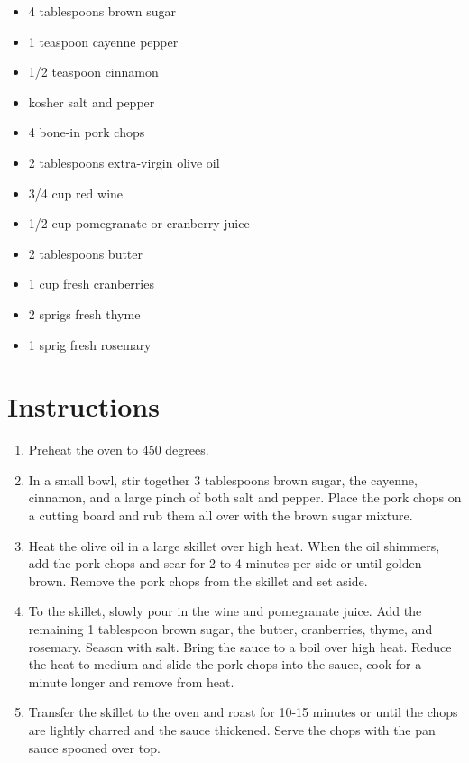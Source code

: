 \documentclass[
  letterpaper,
  DIV=11,
  numbers=noendperiod,
  titlepage=false]{scrreprt}
\providecommand{\tightlist}{%
  \setlength{\itemsep}{0pt}\setlength{\parskip}{0pt}}\usepackage{longtable,booktabs,array}
\begin{document}
\begin{itemize}
\tightlist
\item
  4 tablespoons brown sugar
\item
  1 teaspoon cayenne pepper
\item
  1/2 teaspoon cinnamon
\item
  kosher salt and pepper
\item
  4 bone-in pork chops
\item
  2 tablespoons extra-virgin olive oil
\item
  3/4 cup red wine
\item
  1/2 cup pomegranate or cranberry juice
\item
  2 tablespoons butter
\item
  1 cup fresh cranberries
\item
  2 sprigs fresh thyme
\item
  1 sprig fresh rosemary
\end{itemize}

\section{Instructions}\label{instructions-53}

\begin{enumerate}
\def\labelenumi{\arabic{enumi}.}
\tightlist
\item
  Preheat the oven to 450 degrees.
\item
  In a small bowl, stir together 3 tablespoons brown sugar, the cayenne,
  cinnamon, and a large pinch of both salt and pepper. Place the pork
  chops on a cutting board and rub them all over with the brown sugar
  mixture.
\item
  Heat the olive oil in a large skillet over high heat. When the oil
  shimmers, add the pork chops and sear for 2 to 4 minutes per side or
  until golden brown. Remove the pork chops from the skillet and set
  aside.
\item
  To the skillet, slowly pour in the wine and pomegranate juice. Add the
  remaining 1 tablespoon brown sugar, the butter, cranberries, thyme,
  and rosemary. Season with salt. Bring the sauce to a boil over high
  heat. Reduce the heat to medium and slide the pork chops into the
  sauce, cook for a minute longer and remove from heat.
\item
  Transfer the skillet to the oven and roast for 10-15 minutes or until
  the chops are lightly charred and the sauce thickened. Serve the chops
  with the pan sauce spooned over top.
\end{enumerate}
\end{document}
